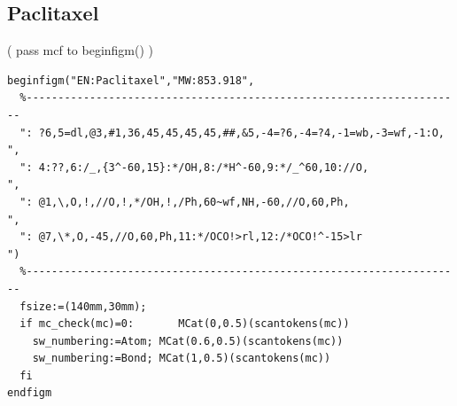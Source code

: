 \documentclass{article}
\begin{document}
{{\subsection{Paclitaxel}
\noindent%
( pass mcf to beginfigm() )
\begin{verbatim}
beginfigm("EN:Paclitaxel","MW:853.918",
  %---------------------------------------------------------------------
  ": ?6,5=dl,@3,#1,36,45,45,45,45,##,&5,-4=?6,-4=?4,-1=wb,-3=wf,-1:O, ",
  ": 4:??,6:/_,{3^-60,15}:*/OH,8:/*H^-60,9:*/_^60,10://O,             ",
  ": @1,\,O,!,//O,!,*/OH,!,/Ph,60~wf,NH,-60,//O,60,Ph,                ",
  ": @7,\*,O,-45,//O,60,Ph,11:*/OCO!>rl,12:/*OCO!^-15>lr              ")
  %---------------------------------------------------------------------
  fsize:=(140mm,30mm);
  if mc_check(mc)=0:       MCat(0,0.5)(scantokens(mc))
    sw_numbering:=Atom; MCat(0.6,0.5)(scantokens(mc))
    sw_numbering:=Bond; MCat(1,0.5)(scantokens(mc))
  fi
endfigm
\end{verbatim}
\newpage
}}
\end{document}
